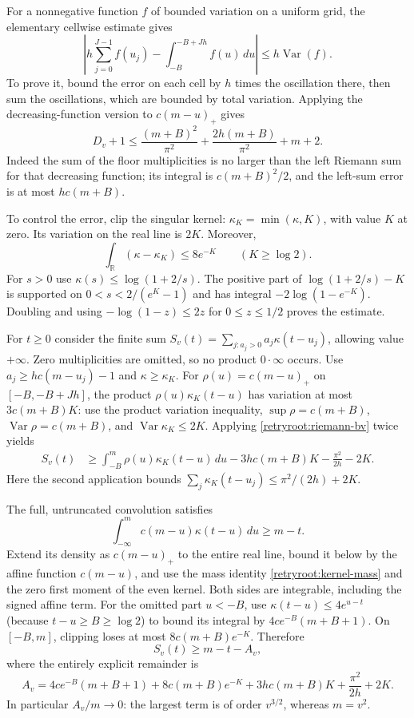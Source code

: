 \documentclass[11pt]{article}
\newcommand{\R}{\mathbb R}
\theoremstyle{remark}
\numberwithin{equation}{section}
\begin{document}
For a nonnegative function $f$ of bounded variation on a uniform grid,
the elementary cellwise estimate gives
\begin{equation}\label{retryroot:riemann-bv}
 \left|h\sum_{j=0}^{J-1}f(u_j)
       -\int_{-B}^{-B+Jh}f(u)\,du\right|
 \le h\operatorname{Var}(f).
\end{equation}
To prove it, bound the error on each cell by $h$ times the oscillation
there, then sum the oscillations, which are bounded by total variation.
Applying the decreasing-function version to $c(m-u)_+$ gives
\begin{equation}\label{retryroot:product-degree}
 D_v+1\le
 \frac{(m+B)^2}{\pi^2}+\frac{2h(m+B)}{\pi^2}+m+2.
\end{equation}
Indeed the sum of the floor multiplicities is no larger than the left
Riemann sum for that decreasing function; its integral is
$c(m+B)^2/2$, and the left-sum error is at most $hc(m+B)$.

To control the error, clip the singular kernel:
$\kappa_K=\min(\kappa,K)$, with value $K$ at zero.
Its variation on the real line is $2K$. Moreover,
\begin{equation}\label{retryroot:kernel-truncation}
 \int_\R(\kappa-\kappa_K)\le8e^{-K}\qquad(K\ge\log2).
\end{equation}
For $s>0$ use $\kappa(s)\le\log(1+2/s)$. The positive part of
$\log(1+2/s)-K$ is supported on $0<s<2/(e^K-1)$ and has integral
$-2\log(1-e^{-K})$. Doubling and using
$-\log(1-z)\le2z$ for $0\le z\le1/2$ proves the estimate.

For $t\ge0$ consider the finite sum
$S_v(t)=\sum_{j:a_j>0} a_j\kappa(t-u_j)$, allowing value $+\infty$.
Zero multiplicities are omitted, so no product $0\cdot\infty$ occurs.
Use $a_j\ge hc(m-u_j)-1$ and $\kappa\ge\kappa_K$.
For $\rho(u)=c(m-u)_+$ on $[-B,-B+Jh]$, the product
$\rho(u)\kappa_K(t-u)$ has variation at most $3c(m+B)K$:
use the product variation inequality, $\sup\rho=c(m+B)$,
$\operatorname{Var}\rho=c(m+B)$, and
$\operatorname{Var}\kappa_K\le2K$.
Applying \eqref{retryroot:riemann-bv} twice yields
\begin{align*}
 S_v(t)&\ge
 \int_{-B}^{m}\rho(u)\kappa_K(t-u)\,du
 -3hc(m+B)K-\frac{\pi^2}{2h}-2K.
\end{align*}
Here the second application bounds
$\sum_j\kappa_K(t-u_j)\le\pi^2/(2h)+2K$.

The full, untruncated convolution satisfies
\[
 \int_{-\infty}^{m}c(m-u)\kappa(t-u)\,du\ge m-t.
\]
Extend its density as $c(m-u)_+$ to the entire real line, bound it
below by the affine function $c(m-u)$, and use the mass identity
\eqref{retryroot:kernel-mass} and the zero first moment of the even
kernel. Both sides are integrable, including the signed affine term.
For the omitted part $u<-B$, use
$\kappa(t-u)\le4e^{u-t}$ (because $t-u\ge B\ge\log2$) to bound its
integral by $4ce^{-B}(m+B+1)$. On $[-B,m]$, clipping loses at most
$8c(m+B)e^{-K}$. Therefore
\begin{equation}\label{retryroot:potential-lower}
 S_v(t)\ge m-t-A_v,
\end{equation}
where the entirely explicit remainder is
\[
 A_v=4ce^{-B}(m+B+1)+8c(m+B)e^{-K}
      +3hc(m+B)K+\frac{\pi^2}{2h}+2K.
\]
In particular $A_v/m\to0$: the largest term is of order $v^{3/2}$,
whereas $m=v^2$.
\end{document}
